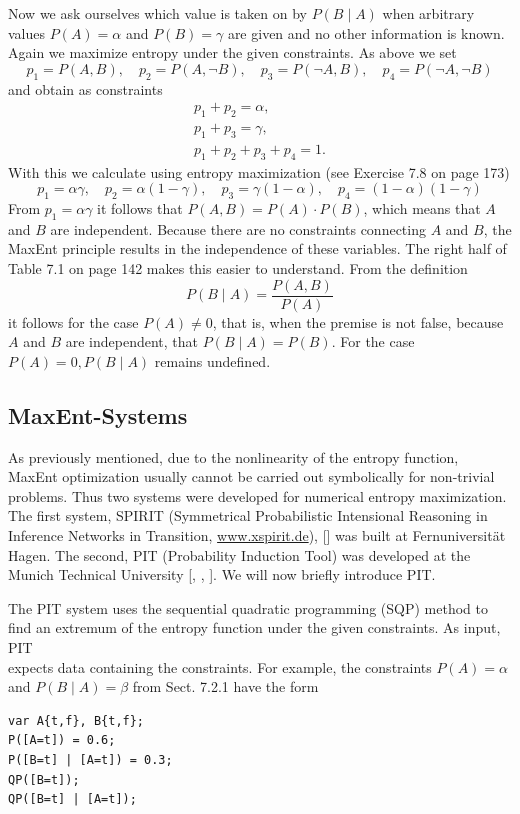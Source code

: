 \documentclass[10pt]{book}
\begin{document}
Now we ask ourselves which value is taken on by $P(B \mid A)$ when arbitrary values $P(A)=\alpha$ and $P(B)=\gamma$ are given and no other information is known. Again we maximize entropy under the given constraints. As above we set
$$
p_{1}=P(A, B), \quad p_{2}=P(A, \neg B), \quad p_{3}=P(\neg A, B), \quad p_{4}=P(\neg A, \neg B)
$$
and obtain as constraints
\begin{gather*}
p_{1}+p_{2}=\alpha,  \tag{7.10}\\
p_{1}+p_{3}=\gamma,  \tag{7.11}\\
p_{1}+p_{2}+p_{3}+p_{4}=1 . \tag{7.12}
\end{gather*}
With this we calculate using entropy maximization (see Exercise 7.8 on page 173)
$$
p_{1}=\alpha \gamma, \quad p_{2}=\alpha(1-\gamma), \quad p_{3}=\gamma(1-\alpha), \quad p_{4}=(1-\alpha)(1-\gamma)
$$
From $p_{1}=\alpha \gamma$ it follows that $P(A, B)=P(A) \cdot P(B)$, which means that $A$ and $B$ are independent. Because there are no constraints connecting $A$ and $B$, the MaxEnt principle results in the independence of these variables. The right half of Table 7.1 on page 142 makes this easier to understand. From the definition
$$
P(B \mid A)=\frac{P(A, B)}{P(A)}
$$
it follows for the case $P(A) \neq 0$, that is, when the premise is not false, because $A$ and $B$ are independent, that $P(B \mid A)=P(B)$. For the case $P(A)=0, P(B \mid A)$ remains undefined.

\subsection{MaxEnt-Systems}
As previously mentioned, due to the nonlinearity of the entropy function, MaxEnt optimization usually cannot be carried out symbolically for non-trivial problems. Thus two systems were developed for numerical entropy maximization. The first system, SPIRIT (Symmetrical Probabilistic Intensional Reasoning in Inference Networks in Transition, \href{http://www.xspirit.de}{www.xspirit.de}), [\cite{rodder1996spirit}] was built at Fernuniversität Hagen. The second, PIT (Probability Induction Tool) was developed at the Munich Technical University [\cite{schramm1996indifferenz}, \cite{ertel1999maxent}, \cite{schramm2000pit}]. We will now briefly introduce PIT.

The PIT system uses the sequential quadratic programming (SQP) method to find an extremum of the entropy function under the given constraints. As input, PIT\\
expects data containing the constraints. For example, the constraints $P(A)=\alpha$ and $P(B \mid A)=\beta$ from Sect. 7.2.1 have the form
\begin{verbatim}
var A{t,f}, B{t,f};
P([A=t]) = 0.6;
P([B=t] | [A=t]) = 0.3;
QP([B=t]);
QP([B=t] | [A=t]);
\end{verbatim}
\end{document}
